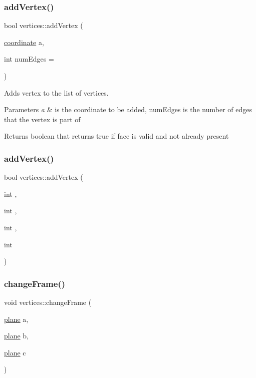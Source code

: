 \subsubsection{\texorpdfstring{add\+Vertex()}{addVertex()}\hspace{0.1cm}{\footnotesize\ttfamily [2/3]}}
{\footnotesize\ttfamily bool vertices\+::add\+Vertex (\begin{DoxyParamCaption}\item[{\mbox{\hyperlink{structcoordinate}{coordinate}}}]{a,  }\item[{int}]{num\+Edges = {} }\end{DoxyParamCaption})}



Adds vertex to the list of vertices. 


\begin{DoxyParams}{Parameters}
{\em a} & is the coordinate to be added, num\+Edges is the number of edges that the vertex is part of \\
\hline
\end{DoxyParams}
\begin{DoxyReturn}{Returns}
boolean that returns true if face is valid and not already present 
\end{DoxyReturn}
\mbox{\label{classvertices_aab2aad643ab383c4192c8e51b8ed3041}} 
\subsubsection{\texorpdfstring{add\+Vertex()}{addVertex()}\hspace{0.1cm}{\footnotesize\ttfamily [3/3]}}
{\footnotesize\ttfamily bool vertices\+::add\+Vertex (\begin{DoxyParamCaption}\item[{int}]{,  }\item[{int}]{,  }\item[{int}]{,  }\item[{int}]{ }\end{DoxyParamCaption})}

\mbox{\label{classvertices_a842f219dca716e76d5c3a8f9db3146f1}} 
\subsubsection{\texorpdfstring{change\+Frame()}{changeFrame()}}
{\footnotesize\ttfamily void vertices\+::change\+Frame (\begin{DoxyParamCaption}\item[{\mbox{\hyperlink{structplane}{plane}}}]{a,  }\item[{\mbox{\hyperlink{structplane}{plane}}}]{b,  }\item[{\mbox{\hyperlink{structplane}{plane}}}]{c }\end{DoxyParamCaption})}



